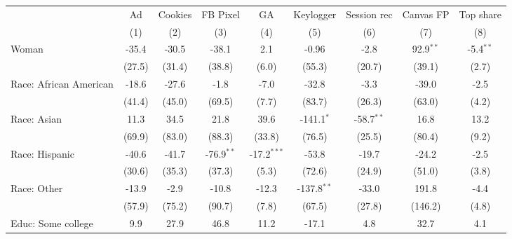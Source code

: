
\begingroup
\centering
\begin{adjustbox}{width = \textwidth, center}
   \begin{tabular}{lcccccccc}
      \toprule
                              & Ad            & Cookies       & FB Pixel      & GA            & Keylogger     & Session rec   & Canvas FP     & Top share \\   
                              & (1)           & (2)           & (3)           & (4)           & (5)           & (6)           & (7)           & (8)\\  
      \midrule 
      Woman                   & -35.4         & -30.5         & -38.1         & 2.1           & -0.96         & -2.8          & 92.9$^{**}$   & -5.4$^{**}$\\   
                              & (27.5)        & (31.4)        & (38.8)        & (6.0)         & (55.3)        & (20.7)        & (39.1)        & (2.7)\\   
      Race: African American  & -18.6         & -27.6         & -1.8          & -7.0          & -32.8         & -3.3          & -39.0         & -2.5\\   
                              & (41.4)        & (45.0)        & (69.5)        & (7.7)         & (83.7)        & (26.3)        & (63.0)        & (4.2)\\   
      Race: Asian             & 11.3          & 34.5          & 21.8          & 39.6          & -141.1$^{*}$  & -58.7$^{**}$  & 16.8          & 13.2\\   
                              & (69.9)        & (83.0)        & (88.3)        & (33.8)        & (76.5)        & (25.5)        & (80.4)        & (9.2)\\   
      Race: Hispanic          & -40.6         & -41.7         & -76.9$^{**}$  & -17.2$^{***}$ & -53.8         & -19.7         & -24.2         & -2.5\\   
                              & (30.6)        & (35.3)        & (37.3)        & (5.3)         & (72.6)        & (24.9)        & (51.0)        & (3.8)\\   
      Race: Other             & -13.9         & -2.9          & -10.8         & -12.3         & -137.8$^{**}$ & -33.0         & 191.8         & -4.4\\   
                              & (57.9)        & (75.2)        & (90.7)        & (7.8)         & (67.5)        & (27.8)        & (146.2)       & (4.8)\\   
      Educ: Some college      & 9.9           & 27.9          & 46.8          & 11.2          & -17.1         & 4.8           & 32.7          & 4.1\\   

\end{tabular}
\end{adjustbox}
